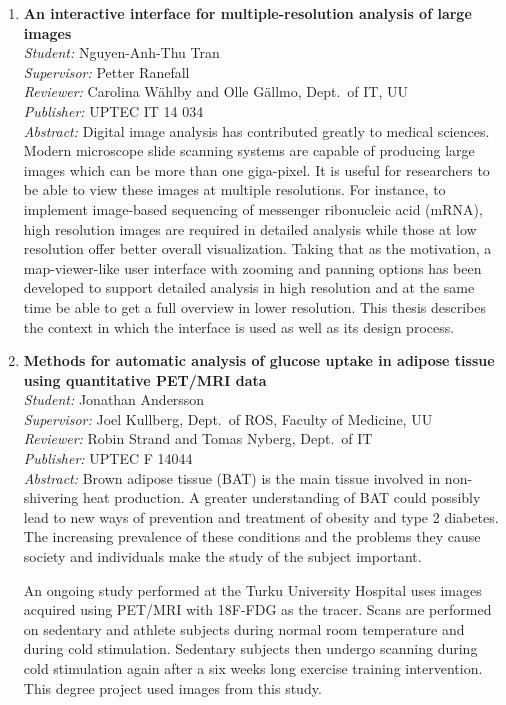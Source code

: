 \begin{small}
\begin{enumerate}
\item\textbf{An interactive interface for multiple-resolution analysis of large images}\\
  \emph{Student:} Nguyen-Anh-Thu Tran\\
  \emph{Supervisor:} Petter Ranefall\\
  \emph{Reviewer:} Carolina W\"{a}hlby and Olle G\"{a}llmo, Dept.~of IT, UU\\
  \emph{Publisher:} UPTEC IT 14 034\\
  \emph{Abstract:} Digital image analysis has contributed greatly to medical sciences. Modern microscope slide scanning systems are capable of producing large images which can be more than one giga-pixel. It is useful for researchers to be able to view these images at multiple resolutions. For instance, to implement image-based sequencing of messenger ribonucleic acid (mRNA), high resolution images are required in detailed analysis while those at low resolution offer better  overall visualization. Taking that as the motivation, a map-viewer-like user interface with zooming and panning options has been developed to support detailed analysis in high resolution and at the same time be able to get a full overview in lower resolution. This thesis describes the context in which the interface is used as well as its design process.

\item\textbf{Methods for automatic analysis of glucose uptake in adipose tissue using quantitative PET/MRI data}\\
  \emph{Student:} Jonathan Andersson \\
  \emph{Supervisor:} Joel Kullberg, Dept.~of ROS, Faculty of Medicine, UU\\
  \emph{Reviewer:} Robin Strand and Tomas Nyberg, Dept.~of IT\\
  \emph{Publisher:} UPTEC F 14044\\
  \emph{Abstract:} Brown adipose tissue (BAT) is the main tissue involved in non-shivering heat production. A greater understanding of BAT could possibly lead to new ways of prevention and treatment of obesity and type 2 diabetes. The increasing prevalence of these conditions and the problems they cause society and individuals make the study of the subject important.

An ongoing study performed at the Turku University Hospital uses images acquired using PET/MRI with 18F-FDG as the tracer. Scans are performed on sedentary and athlete subjects during normal room temperature and during cold stimulation. Sedentary subjects then undergo scanning during cold stimulation again after a six weeks long exercise training intervention. This degree project used images from this study.


\end{enumerate}
\end{small}
